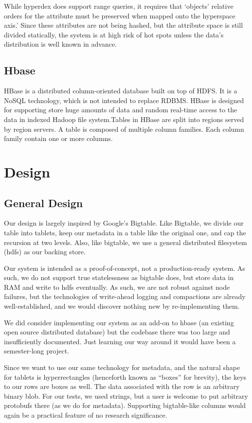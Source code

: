 \documentclass[11pt]{article}
\begin{document}
While hyperdex does support range queries, it requires that `objects' relative orders for the attribute must be preserved when mapped onto the hyperspace axis.' Since these attributes are not being hashed, but the attribute space is still divided statically, the system is at high risk of hot spots unless the data's distribution is well known in advance.

\subsection{Hbase}

HBase is a distributed column-oriented database built on top of HDFS. It is a NoSQL technology, which is not intended to replace RDBMS. HBase is designed for supporting store huge amounts of data and random real-time access to the data in indexed Hadoop file system.Tables in HBase are split into regions served by region servers. A table is composed of multiple column families. Each column family contain one or more columns. 

\section{Design}

\subsection{General Design}

Our design is largely inspired by Google's Bigtable. Like Bigtable, we divide our table into tablets, keep our metadata in a table like the original one, and cap the recursion at two levels. Also, like bigtable, we use a general distributed filesystem (hdfs) as our backing store.

Our system is intended as a proof-of-concept, not a production-ready system. As such, we do not support true statelessness as bigtable does, but store data in RAM and write to hdfs eventually. As such, we are not robust against node failures, but the technologies of write-ahead logging and compactions are already well-established, and we would discover nothing new by re-implementing them.

We did consider implementing our system as an add-on to hbase (an existing open source distributed database) but the codebase there was too large and insufficiently documented. Just learning our way around it would have been a semester-long project.

Since we want to use our same technology for metadata, and the natural shape for tablets is hyperrectangles (henceforth known as ``boxes'' for brevity), the keys to our rows are boxes as well. The data associated with the row is an arbitrary binary blob. For our tests, we used strings, but a user is welcome to put arbitrary protobufs there (as we do for metadata). Supporting bigtable-like columns would again be a practical feature of no research significance.
\end{document}
